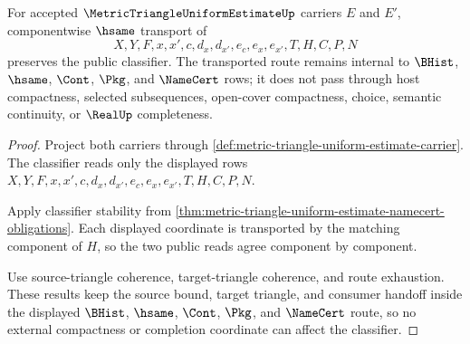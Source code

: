 \begin{theorem}
\label{thm:metric-triangle-uniform-estimate-classifier-transport}
For accepted $\MetricTriangleUniformEstimateUp$ carriers $E$ and $E'$, componentwise $\hsame$ transport of
$$
X,Y,F,x,x',c,d_x,d_{x'},e_c,e_x,e_{x'},T,H,C,P,N
$$
preserves the public classifier. The transported route remains internal to $\BHist$, $\hsame$, $\Cont$, $\Pkg$, and $\NameCert$ rows; it does not pass through host compactness, selected subsequences, open-cover compactness, choice, semantic continuity, or $\RealUp$ completeness.
\end{theorem}
\begin{proof}
Project both carriers through \autoref{def:metric-triangle-uniform-estimate-carrier}. The classifier reads only the displayed rows $X,Y,F,x,x',c,d_x,d_{x'},e_c,e_x,e_{x'},T,H,C,P,N$.

Apply classifier stability from \autoref{thm:metric-triangle-uniform-estimate-namecert-obligations}. Each displayed coordinate is transported by the matching component of $H$, so the two public reads agree component by component.

Use source-triangle coherence, target-triangle coherence, and route exhaustion. These results keep the source bound, target triangle, and consumer handoff inside the displayed $\BHist$, $\hsame$, $\Cont$, $\Pkg$, and $\NameCert$ route, so no external compactness or completion coordinate can affect the classifier.
\end{proof}

